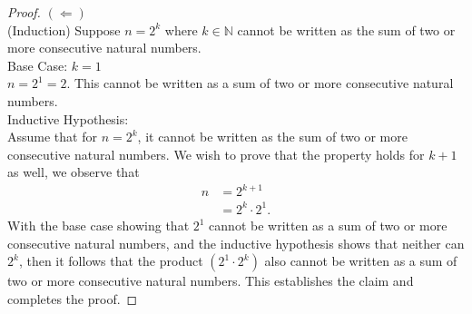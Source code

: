 \documentclass[11pt]{article}
\newcommand{\N}{\mathbb{N}}
\begin{document}
\begin{proof}
	$(\Longleftarrow)$\\
	(Induction) Suppose $n = 2^k$ where $k \in \N$ cannot be written as the sum of two or more consecutive natural numbers.\\
	Base Case: $k=1$\\
	$n = 2^1 = 2$. This cannot be written as a sum of two or more consecutive natural numbers.\\
	Inductive Hypothesis:\\
	Assume that for $n=2^k$, it cannot be written as the sum of two or more consecutive natural numbers. We wish to prove that the property holds for $k+1$ as well, we observe that
	\begin{align*}
		n &= 2^{k+1}\\
		&= 2^k \cdot 2^1.
	\end{align*}
	With the base case showing that $2^1$ cannot be written as a sum of two or more consecutive natural numbers, and the inductive hypothesis shows that neither can $2^k$, then it follows that the product $(2^1 \cdot 2^k)$ also cannot be written as a sum of two or more consecutive natural numbers. This establishes the claim and completes the proof.
\end{proof}





	
\end{document}
